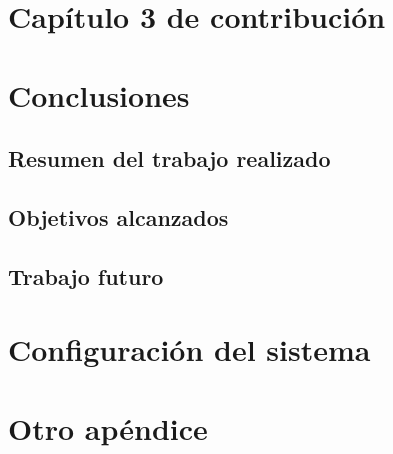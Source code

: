 \documentclass[11pt,spanish,listoffigures,listoftables]{tfgetsinf}
\begin{document}
\chapter{Capítulo 3 de contribución}   %


\chapter{Conclusiones}  %

\section{Resumen del trabajo realizado} %

\section{Objetivos alcanzados}         %

\section{Trabajo futuro}               %


\printbibliography 
\cleardoublepage


\APPENDIX

\chapter{Configuración del sistema}

\chapter{Otro apéndice}
\end{document}
